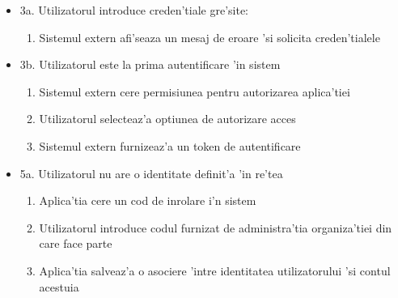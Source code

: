 \documentclass[12pt,a4paper,twoside]{report}
\begin{document}
\begin{itemize}
    \item 3a. Utilizatorul introduce creden'tiale gre'site:
        \begin{enumerate}
            \item Sistemul extern afi'seaza un mesaj de eroare 'si solicita creden'tialele
        \end{enumerate}
    \item 3b. Utilizatorul este la prima autentificare 'in sistem
        \begin{enumerate}
            \item Sistemul extern cere permisiunea pentru autorizarea aplica'tiei
            \item Utilizatorul selecteaz'a optiunea de autorizare acces
            \item Sistemul extern furnizeaz'a un token de autentificare
        \end{enumerate}
    \item 5a. Utilizatorul nu are o identitate definit'a 'in re'tea
        \begin{enumerate}
            \item Aplica'tia cere un cod de inrolare i'n sistem
            \item Utilizatorul introduce codul furnizat de administra'tia organiza'tiei din care face parte
            \item Aplica'tia salveaz'a o asociere 'intre identitatea utilizatorului 'si contul acestuia
        \end{enumerate}
\end{itemize}
\end{document}
